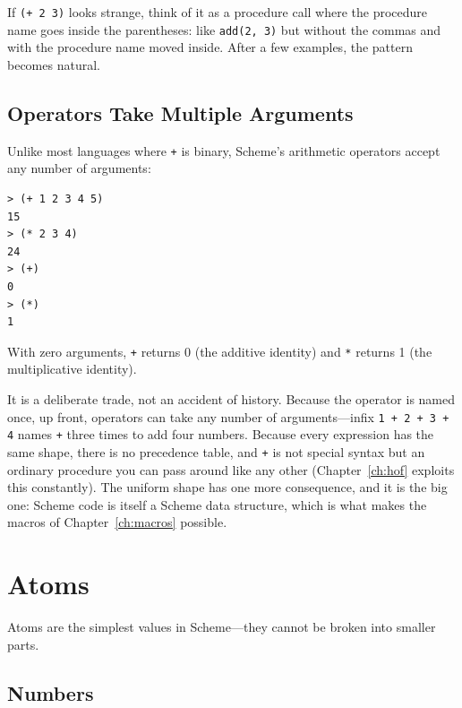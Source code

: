 \begin{note}
If \texttt{(+ 2 3)} looks strange, think of it as a procedure call where the procedure name goes inside the parentheses: like \texttt{add(2, 3)} but without the commas and with the procedure name moved inside. After a few examples, the pattern becomes natural.
\end{note}

\subsection{Operators Take Multiple Arguments}

Unlike most languages where \texttt{+} is binary, Scheme's arithmetic operators accept any number of arguments:

\begin{lstlisting}[style=repl]
> (+ 1 2 3 4 5)
15
> (* 2 3 4)
24
> (+)
0
> (*)
1
\end{lstlisting}

With zero arguments, \texttt{+} returns 0 (the additive identity) and \texttt{*} returns 1 (the multiplicative identity).

\begin{note}
It is a deliberate trade, not an accident of history. Because the operator is named once, up front, operators can take any number of arguments---infix \texttt{1 + 2 + 3 + 4} names \texttt{+} three times to add four numbers. Because every expression has the same shape, there is no precedence table, and \texttt{+} is not special syntax but an ordinary procedure you can pass around like any other (Chapter~\ref{ch:hof} exploits this constantly). The uniform shape has one more consequence, and it is the big one: Scheme code is itself a Scheme data structure, which is what makes the macros of Chapter~\ref{ch:macros} possible.
\end{note}

\section{Atoms}

Atoms are the simplest values in Scheme---they cannot be broken into smaller parts.

\subsection{Numbers}

